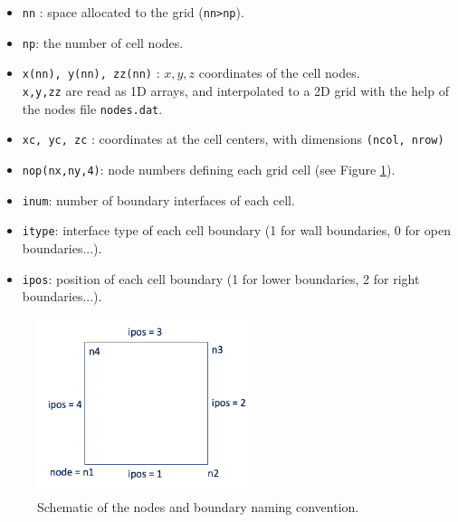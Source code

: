 \documentclass{article}
\newcommand{\code}[1]{\texttt{#1}}
\begin{document}
\begin{itemize}
	\item \code{nn} : space allocated to the grid (\code{nn>np}).
	\item  \code{np}:  the number of cell nodes. 
	\item \code{x(nn), y(nn), zz(nn)} : $x,y,z$ coordinates of the cell nodes.  \\[0.1cm]
		\code{x,y,zz} are read as 1D arrays, and interpolated to a 2D grid with the help of the nodes file \code{nodes.dat}.
		\item  \code{xc, yc, zc} : coordinates at the cell centers, with dimensions \code{(ncol, nrow)}

	\item \code{nop(nx,ny,4)}: node numbers defining each grid cell (see Figure \ref{nodes}).  

	\item \code{inum}: number of boundary interfaces of each cell.
	\item \code{itype}:  interface type of each cell boundary (1 for wall boundaries, 0 for open boundaries...).  
	\item \code{ipos}: position of each cell boundary (1 for lower boundaries, 2 for right boundaries...).
\end{itemize}


 \begin{figure}[h]
 \centering
\includegraphics[width=15pc]{grid/boundaries.png}
 \caption{Schematic of the nodes and boundary naming convention. }
 \label{nodes}
 \end{figure}
 
\end{document}
